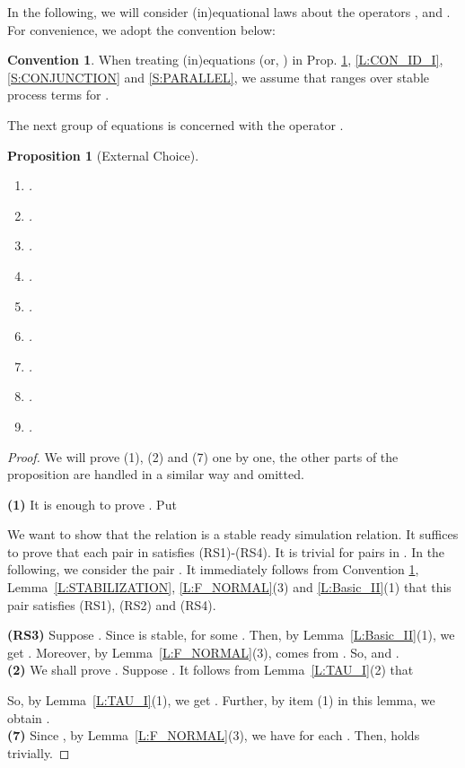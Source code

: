 \documentclass{elsarticle}
\theoremstyle{plain}
\newtheorem{proposition}[theorem]{Proposition}
\theoremstyle{definition}
\newtheorem{convention}[theorem]{Convention}
\begin{document}
In the following, we will consider (in)equational laws about the operators ,  and .
For convenience, we adopt the convention below:

\begin{convention}\label{C:STABLE_TERM}
  When treating (in)equations  (or, ) in Prop. \ref{L:EC2}, \ref{L:CON_ID_I}, \ref{S:CONJUNCTION} and \ref{S:PARALLEL}, we assume that  ranges over stable process terms for .
\end{convention}

The next group of equations is concerned with the operator .

\begin{proposition}[External Choice]\hfill\label{L:EC2}
    \begin{enumerate}
      \item .
      \item .
      \item .
      \item .
      \item .
      \item .
      \item .
      \item .
      \item .
    \end{enumerate}
\end{proposition}
\begin{proof}
    We will prove (1), (2) and (7) one by one, the other parts of the proposition are handled in a similar way and omitted.

   \noindent \textbf{(1)}
    It is enough to prove . Put
    

    We want to show that the relation  is a stable ready simulation relation. It suffices to prove that each pair in  satisfies (RS1)-(RS4). It is trivial for pairs in . In the following, we consider the pair . It immediately follows from Convention \ref{C:STABLE_TERM}, Lemma~\ref{L:STABILIZATION}, \ref{L:F_NORMAL}(3) and \ref{L:Basic_II}(1) that this pair satisfies (RS1), (RS2) and (RS4).

    \textbf{(RS3)} Suppose .
    Since  is stable,  for some .
    Then, by Lemma~\ref{L:Basic_II}(1),  we get .
    Moreover, by Lemma~\ref{L:F_NORMAL}(3),  comes from .
    So,  and .\\

    \noindent\textbf{(2)} We shall prove .
    Suppose .
    It follows from Lemma~\ref{L:TAU_I}(2) that
    
    So, by Lemma~\ref{L:TAU_I}(1), we get . Further, by item (1) in this lemma, we obtain .\\

    \noindent \textbf{(7)} Since , by Lemma~\ref{L:F_NORMAL}(3), we have   for each . Then,  holds trivially.
\end{proof}
\end{document}

